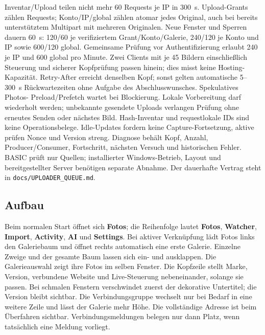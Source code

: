 \documentclass[11pt,a4paper]{article}
\newcommand{\ui}[1]{\textbf{#1}}
\begin{document}
Inventar/Upload teilen nicht mehr 60 Requests je IP in 300~s.
Upload-Grants zählen Requests; Konto/IP/global zählen atomar jedes Original,
auch bei bereits unterstütztem Multipart mit mehreren Originalen.
Neue Fenster und Sperren dauern 60~s: 120/60 je verifiziertem
Grant/Konto/Galerie, 240/120 je Konto und IP sowie 600/120 global.
Gemeinsame Prüfung vor Authentifizierung erlaubt 240 je IP und 600 global
pro Minute. Zwei Clients mit je 45 Bildern einschließlich Steuerung und
sicherer Kopfprüfung passen hinein; dies misst keine Hosting-Kapazität.
Retry-After erreicht denselben Kopf; sonst gelten automatische 5--300~s
Rückwartezeiten ohne Aufgabe des Abschlusswunsches. Spekulatives Photos-
Preload/Prefetch wartet bei Blockierung. Lokale Vorbereitung darf wiederholt
werden; unbekannte gesendete Uploads verlangen Prüfung ohne erneutes Senden
oder nächstes Bild. Hash-Inventar und requestlokale IDs sind keine
Operationsbelege. Idle-Updates fordern keine Capture-Fortsetzung, aktive
prüfen Nonce und Version streng. Diagnose behält Kopf, Anzahl,
Producer/Consumer, Fortschritt, nächsten Versuch und historischen Fehler.
BASIC prüft nur Quellen; installierter Windows-Betrieb, Layout und
bereitgestellter Server benötigen separate Abnahme.
Der dauerhafte Vertrag steht in \texttt{docs/UPLOADER\_QUEUE.md}.

\subsection{Aufbau}

Beim normalen Start öffnet sich \ui{Fotos}; die Reihenfolge lautet
\ui{Fotos}, \ui{Watcher}, \ui{Import}, \ui{Activity}, \ui{AI} und
\ui{Settings}. Bei aktiver Verknüpfung lädt Fotos links den Galeriebaum
und öffnet rechts automatisch eine erste Galerie. Einzelne Zweige und der
gesamte Baum lassen sich ein- und ausklappen. Die Galerieauswahl zeigt
ihre Fotos im selben Fenster.
Die Kopfzeile stellt Marke, Version, verbundene Website und Live-Steuerung
nebeneinander, solange sie passen. Bei schmalen Fenstern verschwindet zuerst
der dekorative Untertitel; die Version bleibt sichtbar. Die Verbindungsgruppe
wechselt nur bei Bedarf in eine weitere Zeile und lässt der Galerie mehr Höhe.
Die vollständige Adresse ist beim Überfahren sichtbar. Verbindungsmeldungen
belegen nur dann Platz, wenn tatsächlich eine Meldung vorliegt.
\end{document}
